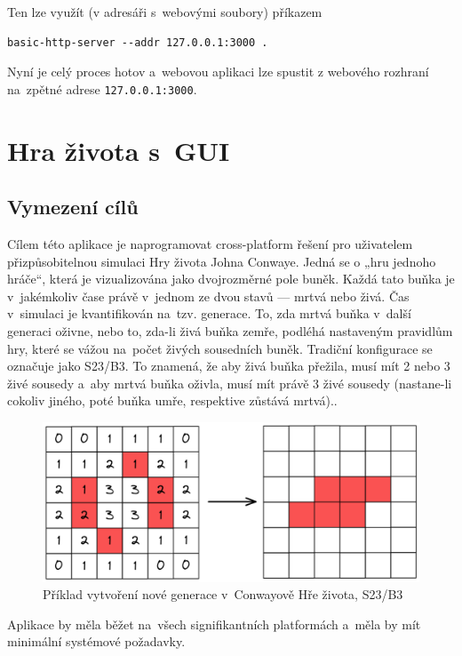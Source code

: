 \documentclass[a4paper, 12pt, twoside]{article} %
\begin{document}
		Ten lze využít (v adresáři s~webovými soubory) příkazem
		\begin{verbatim}
basic-http-server --addr 127.0.0.1:3000 .
		\end{verbatim}
		
		Nyní je celý proces hotov a~webovou aplikaci lze spustit z webového rozhraní na~zpětné adrese \texttt{127.0.0.1:3000}.\cite{wasm_vid, wasm_gh}

\section{Hra života s~GUI}
	\subsection{Vymezení cílů}
		Cílem této aplikace je naprogramovat cross-platform řešení pro uživatelem přizpůsobitelnou simulaci Hry života Johna Conwaye. Jedná se o „hru jednoho hráče“, která je vizualizována jako dvojrozměrné pole buněk. Každá tato buňka je v~jakémkoliv čase právě v~jednom ze dvou stavů — mrtvá nebo živá. Čas v~simulaci je kvantifikován na~tzv. generace. To, zda mrtvá buňka v~další generaci oživne, nebo to, zda-li živá buňka zemře, podléhá nastaveným pravidlům hry, které se vážou na~počet živých sousedních buněk. Tradiční konfigurace se označuje jako S23/B3. To znamená, že aby živá buňka přežila, musí mít 2 nebo 3 živé sousedy a~aby mrtvá buňka oživla, musí mít právě 3 živé sousedy (nastane-li cokoliv jiného, poté buňka umře, respektive zůstává mrtvá).\cite{conway}.
		\begin{center}
			\begin{figure}[H]
				\centering
				\includegraphics[width=.82\linewidth]{conway}
				\caption{Příklad vytvoření nové generace v~Conwayově Hře života, S23/B3}
				\label{fig:conway}
			\end{figure}
		\end{center}
	
		Aplikace by měla běžet na~všech signifikantních platformách a~měla by mít minimální systémové požadavky.
	
\end{document}

